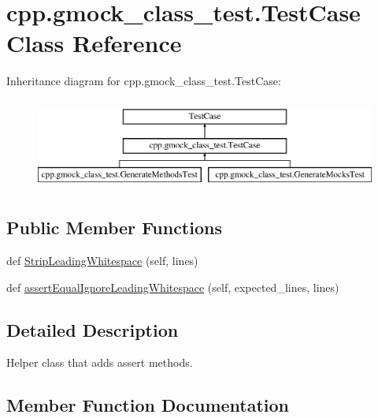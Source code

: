 \hypertarget{classcpp_1_1gmock__class__test_1_1_test_case}{}\section{cpp.\+gmock\+\_\+class\+\_\+test.\+Test\+Case Class Reference}
\label{classcpp_1_1gmock__class__test_1_1_test_case}
Inheritance diagram for cpp.\+gmock\+\_\+class\+\_\+test.\+Test\+Case\+:\begin{figure}[H]
\begin{center}
\leavevmode
\includegraphics[height=3.000000cm]{d0/d8a/classcpp_1_1gmock__class__test_1_1_test_case}
\end{center}
\end{figure}
\subsection*{Public Member Functions}
\begin{DoxyCompactItemize}
\item 
def \mbox{\hyperlink{classcpp_1_1gmock__class__test_1_1_test_case_a366b15717eebc41e397357868c5734c5}{Strip\+Leading\+Whitespace}} (self, lines)
\item 
def \mbox{\hyperlink{classcpp_1_1gmock__class__test_1_1_test_case_a68f88bba11511f8c582123d47bf80464}{assert\+Equal\+Ignore\+Leading\+Whitespace}} (self, expected\+\_\+lines, lines)
\end{DoxyCompactItemize}


\subsection{Detailed Description}
\begin{DoxyVerb}Helper class that adds assert methods.\end{DoxyVerb}
 

\subsection{Member Function Documentation}
\mbox{\label{classcpp_1_1gmock__class__test_1_1_test_case_a68f88bba11511f8c582123d47bf80464}} 
